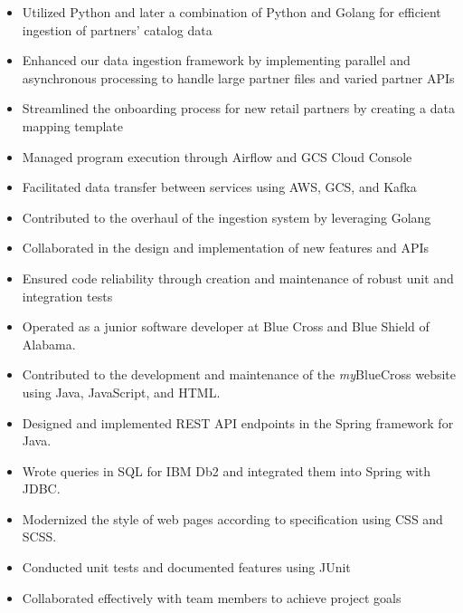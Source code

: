\documentclass[10pt]{setzerresume}
\begin{document}
  \begin{itemize}[nosep]
    \item Utilized Python and later a combination of Python and Golang for efficient ingestion of partners' catalog data
    \item Enhanced our data ingestion framework by implementing parallel and asynchronous processing to handle large partner files and varied partner APIs
    \item Streamlined the onboarding process for new retail partners by creating a data mapping template
    \item Managed program execution through Airflow and GCS Cloud Console
    \item Facilitated data transfer between services using AWS, GCS, and Kafka
    \item Contributed to the overhaul of the ingestion system by leveraging Golang
    \item Collaborated in the design and implementation of new features and APIs
    \item Ensured code reliability through creation and maintenance of robust unit and integration tests
  \end{itemize}


  \begin{itemize}[nosep]
    \item Operated as a junior software developer at Blue Cross and Blue Shield of Alabama.
    \item Contributed to the development and maintenance of the \textit{my}BlueCross website using Java, JavaScript, and HTML.
    \item Designed and implemented REST API endpoints in the Spring framework for Java.
    \item Wrote queries in SQL for IBM Db2 and integrated them into Spring with JDBC. %
    \item Modernized the style of web pages according to specification using CSS and SCSS. %
    \item Conducted unit tests and documented features using JUnit
    \item Collaborated effectively with team members to achieve project goals
  \end{itemize}


\end{document}
